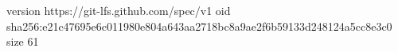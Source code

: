 version https://git-lfs.github.com/spec/v1
oid sha256:e21c47695e6c011980e804a643aa2718bc8a9ae2f6b59133d248124a5cc8e3c0
size 61
